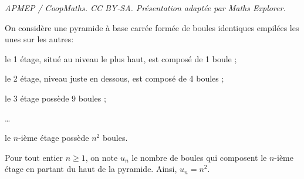 \documentclass[10pt]{article}
\begin{document}
\noindent\textit{APMEP / CoopMaths. CC BY-SA. Présentation adaptée par Maths Explorer.}\par\medskip
\medskip

On considère une pyramide à base carrée formée de boules identiques empilées les unes sur les autres:

\begin{list}{\textbullet}{}
\item le 1 étage, situé au niveau le plus haut, est composé de 1 boule ;
\item le 2 étage, niveau juste en dessous, est composé de 4 boules ;
\item le 3 étage possède 9 boules ;
\item \ldots
\item le $n$-ième étage possède $n^2$ boules.
\end{list}

\medskip

Pour tout entier $n \geqslant 1$, on note $u_n$ le nombre de boules qui composent le $n$-ième étage en partant du haut de la pyramide. Ainsi, $u_n = n^2$.
\end{document}
